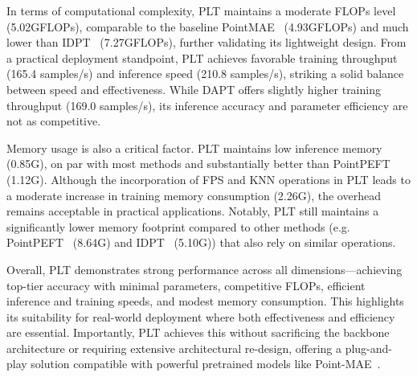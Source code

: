 In terms of computational complexity, PLT maintains a moderate FLOPs level (5.02GFLOPs), comparable to the baseline PointMAE~\cite{pang2022masked} (4.93GFLOPs) and much lower than IDPT~\cite{zha2023instance} (7.27GFLOPs), further validating its lightweight design. From a practical deployment standpoint, PLT achieves favorable training throughput (165.4 samples/s) and inference speed (210.8 samples/s), striking a solid balance between speed and effectiveness. While DAPT offers slightly higher training throughput (169.0 samples/s), its inference accuracy and parameter efficiency are not as competitive.

Memory usage is also a critical factor. PLT maintains low inference memory (0.85G), on par with most methods and substantially better than PointPEFT~\cite{tang2024point} (1.12G). Although the incorporation of FPS and KNN operations in PLT leads to a moderate increase in training memory consumption (2.26G), the overhead remains acceptable in practical applications. Notably, PLT still maintains a significantly lower memory footprint compared to other methods (e.g. PointPEFT~\cite{tang2024point} (8.64G) and IDPT~\cite{zha2023instance} (5.10G)) that also rely on similar operations.

Overall, PLT demonstrates strong performance across all dimensions—achieving top-tier accuracy with minimal parameters, competitive FLOPs, efficient inference and training speeds, and modest memory consumption. This highlights its suitability for real-world deployment where both effectiveness and efficiency are essential. Importantly, PLT achieves this without sacrificing the backbone architecture or requiring extensive architectural re-design, offering a plug-and-play solution compatible with powerful pretrained models like Point-MAE~\cite{pang2022masked}.